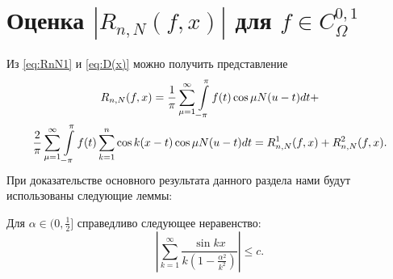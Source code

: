 \section{Оценка $|R_{n,N}(f,x)|$ для $f \in C^{0,1}_\Omega$}
Из  \eqref{eq:RnN1} и \eqref{eq:D(x)} можно получить представление
\begin{multline*}
R_{n,N}(f,x)=\frac{1}{\pi}\sum_{\mu=1}^{\infty}\intop_{-\pi}^{\pi}f(t)\cos\mu N(u-t)dt+\\
\frac{2}{\pi}\sum_{\mu=1}^{\infty}\intop_{-\pi}^{\pi}f(t)\sum_{k=1}^{n}\cos k(x-t) \cos \mu N(u-t)dt=
R_{n,N}^{1}(f,x)+R_{n,N}^{2}(f,x).
\end{multline*}
При доказательстве основного результата данного раздела нами будут использованы следующие леммы:
\begin{lemma} \label{sum_sin_kx2_with_alpha}
	Для $\alpha \in (0, \frac{1}{2}]$ справедливо следующее неравенство:
	\begin{equation*}
	\left|
	\sum_{k=1}^{\infty} \frac{\sin kx}{k\left(1-\frac{\alpha^2}{k^2}\right)}
	\right|
	\leq
	c.
	\end{equation*}
\end{lemma}

